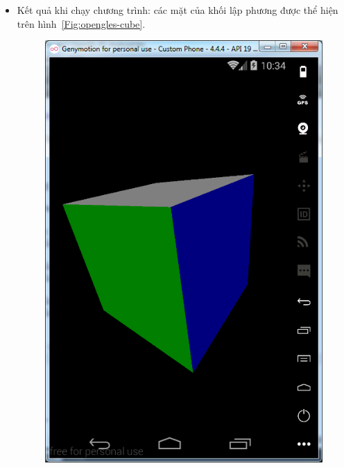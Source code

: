 \documentclass[13pt,a4paper]{extreport}
\begin{document}
\begin{enumerate}[{\it a.}]
\begin{itemize}
				\item Kết quả khi chạy chương trình: các mặt của khối lập phương được thể hiện trên hình~\ref{Fig:opengles-cube}.
					\begin{figure}[!h]
						\begin{center}
							\includegraphics[scale=.6]{opengles-cube-1.png}
							\hspace{.5cm}

\end{center}
\end{figure}
\end{itemize}
\end{enumerate}
\end{document}
